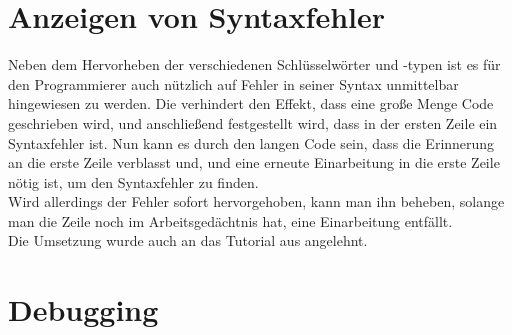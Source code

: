 \section{Anzeigen von Syntaxfehler}
Neben dem Hervorheben der verschiedenen Schlüsselwörter und -typen ist es für den Programmierer auch nützlich auf Fehler in seiner Syntax unmittelbar hingewiesen zu werden.
Die verhindert den Effekt, dass eine große Menge Code geschrieben wird, und anschließend festgestellt wird, dass in der ersten Zeile ein Syntaxfehler ist.
Nun kann es durch den langen Code sein, dass die Erinnerung an die erste Zeile verblasst und, und eine erneute Einarbeitung in die erste Zeile nötig ist, um den Syntaxfehler zu finden.\\
Wird allerdings der Fehler sofort hervorgehoben, kann man ihn beheben, solange man die Zeile noch im Arbeitsgedächtnis hat, eine Einarbeitung entfällt.\\
Die Umsetzung wurde auch an das Tutorial aus \cite{netbeansSyntax} angelehnt.

\section{Debugging}

\endinput
